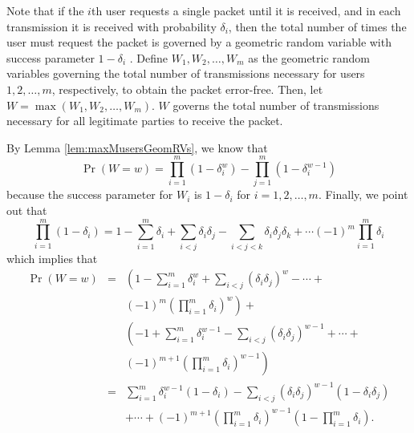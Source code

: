 \documentclass[10pt,twocolumn,twoside]{IEEEtran} \newlength{\pic}
\theoremstyle{definition}
\theoremstyle{remark}
\theoremstyle{plain}
\begin{document}
\begin{IEEEproof}
Note that if the $i$th user requests a single packet until it is received, and in each transmission it is received with probability $\delta_i$, then the total number of times the user must request the packet is governed by a geometric random variable with success parameter $1-\delta_i$ \cite{Grimmett_ProbBook}. Define $W_1, W_2, \ldots, W_m$ as the geometric random variables governing the total number of transmissions necessary for users $1,2,\ldots,m$, respectively, to obtain the packet error-free. Then, let $W = \max(W_1,W_2,\ldots,W_m)$. $W$ governs the total number of transmissions necessary for all legitimate parties to receive the packet.

By Lemma \ref{lem:maxMusersGeomRVs}, we know that
\begin{equation}
 \Pr(W=w) = \prod_{i=1}^m(1-\delta_i^w) - \prod_{j=1}^m(1-\delta_i^{w-1})
\end{equation}
because the success parameter for $W_i$ is $1-\delta_i$ for $i=1,2,\ldots,m$. Finally, we point out that
\begin{equation}
 \prod_{i=1}^m(1-\delta_i) = 1 - \sum_{i=1}^m\delta_i + \sum_{i<j}\delta_i\delta_j - \sum_{i<j<k}\delta_i\delta_j\delta_k + \cdots (-1)^m\prod_{i=1}^m\delta_i
\end{equation}
which implies that
\begin{eqnarray}
 \Pr(W=w) &=& \left(1 - \sum_{i=1}^m\delta_i^w + \sum_{i<j}(\delta_i\delta_j)^w - \cdots + \right.\nonumber \\ &&\left.(-1)^{m}(\prod_{i=1}^m\delta_i)^w\right) + \nonumber \\
 && \left(-1 + \sum_{i=1}^m\delta_i^{w-1} - \sum_{i<j}(\delta_i\delta_j)^{w-1} + \cdots + \right.\nonumber \\ &&\left. (-1)^{m+1}(\prod_{i=1}^m\delta_i)^{w-1}\right) \nonumber \\
 &=& \sum_{i=1}^m\delta_i^{w-1}(1-\delta_i) - \sum_{i<j}(\delta_i\delta_j)^{w-1}(1-\delta_i\delta_j)  \nonumber \\ && + \cdots + (-1)^{m+1}(\prod_{i=1}^m\delta_i)^{w-1}(1-\prod_{i=1}^m\delta_i). \nonumber
\end{eqnarray}


\end{IEEEproof}
\end{document}
